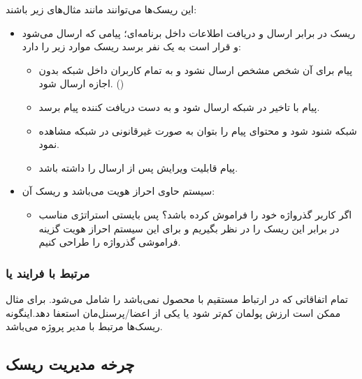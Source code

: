 این ریسک‌ها می‌توانند مانند مثال‌های زیر باشند:

\begin{itemize}
    \item ریسک در برابر ارسال و دریافت اطلاعات داخل برنامه‌ای؛ پیامی که ارسال
    می‌شود و قرار است به یک نفر برسد ریسک موارد زیر را دارد: \begin{itemize}
        \item پیام برای آن شخص مشخص ارسال نشود و به تمام کاربران داخل شبکه بدون
        اجازه ارسال شود. ()
        \item پیام با تاخیر در شبکه ارسال شود و به دست دریافت کننده پیام برسد.
        \item شبکه شنود شود و محتوای پیام را بتوان به صورت غیرقانونی در شبکه
        مشاهده نمود.
        \item پیام قابلیت ویرایش پس از ارسال را داشته باشد.
    \end{itemize}
    \item سیستم حاوی احراز هویت می‌باشد و ریسک آن: \begin{itemize}
        \item اگر کاربر گذرواژه خود را فراموش کرده باشد؟ پس بایستی استراتژی
        مناسب در برابر این ریسک را در نظر بگیریم و برای این سیستم احراز هویت
        گزینه فراموشی گذرواژه را طراحی کنیم.
    \end{itemize}
\end{itemize}

\subsubsection{مرتبط با فرایند یا }

تمام اتفاقاتی که در ارتباط مستقیم با محصول نمی‌باشد را شامل می‌شود. برای مثال
ممکن است ارزش پولمان کم‌تر شود یا یکی از اعضا/پرسنل‌مان استعفا دهد.اینگونه
ریسک‌ها مرتبط با مدیر پروژه می‌باشد.

\subsection{چرخه مدیریت ریسک}

